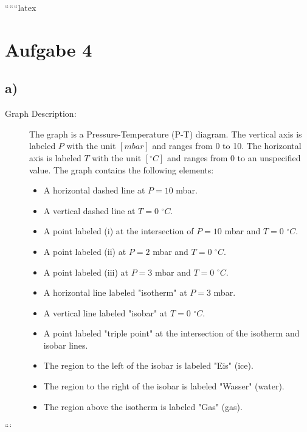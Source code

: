 
``````latex


\section*{Aufgabe 4}

\subsection*{a)}

\begin{description}
    \item[Graph Description:] The graph is a Pressure-Temperature (P-T) diagram. The vertical axis is labeled \( P \) with the unit \([mbar]\) and ranges from 0 to 10. The horizontal axis is labeled \( T \) with the unit \([^\circ C]\) and ranges from 0 to an unspecified value. The graph contains the following elements:
    \begin{itemize}
        \item A horizontal dashed line at \( P = 10 \) mbar.
        \item A vertical dashed line at \( T = 0 \) \( ^\circ C \).
        \item A point labeled (i) at the intersection of \( P = 10 \) mbar and \( T = 0 \) \( ^\circ C \).
        \item A point labeled (ii) at \( P = 2 \) mbar and \( T = 0 \) \( ^\circ C \).
        \item A point labeled (iii) at \( P = 3 \) mbar and \( T = 0 \) \( ^\circ C \).
        \item A horizontal line labeled "isotherm" at \( P = 3 \) mbar.
        \item A vertical line labeled "isobar" at \( T = 0 \) \( ^\circ C \).
        \item A point labeled "triple point" at the intersection of the isotherm and isobar lines.
        \item The region to the left of the isobar is labeled "Eis" (ice).
        \item The region to the right of the isobar is labeled "Wasser" (water).
        \item The region above the isotherm is labeled "Gas" (gas).
    \end{itemize}
\end{description}

```